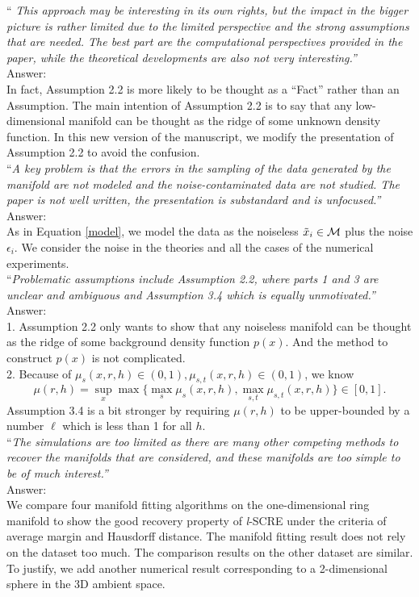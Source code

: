 \documentclass[12pt]{article}
\begin{document}
\noindent ``\textit{ This approach may be interesting in its own rights, but the impact in the bigger picture is rather limited due to the limited perspective and the strong assumptions that are needed. The best part are the computational perspectives provided in the paper, while the theoretical developments are also not very interesting.'' }\\
Answer:\\
In fact, Assumption 2.2 is more likely to be thought as a ``Fact'' rather than an Assumption. The main intention of Assumption 2.2 is to say that any low-dimensional manifold can be thought as the ridge of some unknown density function. In this new version of the manuscript, we modify the presentation of Assumption 2.2 to avoid the confusion.
\\
\noindent ``\textit {A key problem is that the errors in the sampling of the data generated by the manifold are not modeled and the noise-contaminated data are not studied. The paper is not well written, the presentation is substandard  and is unfocused.'' }\\
Answer:\\
As in Equation \eqref{model}, we model the data as the noiseless $\tilde{x}_i\in \cal M$ plus the noise $\epsilon_i$. We consider the noise in the theories and all the cases of the numerical experiments.\\

\noindent ``\textit{Problematic assumptions include Assumption 2.2, where parts 1 and 3 are unclear and ambiguous and Assumption 3.4 which is equally unmotivated.''}\\
Answer:\\
1. Assumption 2.2 only wants to show that any noiseless manifold can be thought as the ridge of some background density function $p(x)$. And the method to construct $p(x)$ is not complicated.\\
2. Because of $\mu_s(x,r,h)\in(0,1),\mu_{s,t}(x,r,h)\in (0,1)$, we know 
\[
\mu(r,h) = \sup_x \max\{\max_s \mu_s(x,r,h), \max_{s,t}\mu_{s,t}(x,r,h)\}\in [0,1].
\]
Assumption 3.4 is a bit stronger by requiring $\mu(r,h)$ to be upper-bounded by a number $\ell$ which is less than 1 for all $h$.\\
 \noindent ``\textit{The simulations are too limited as there are many other competing methods to recover the manifolds that are considered, and these manifolds are too simple to be of much interest.'' } \\
 Answer:\\
 We compare four manifold fitting algorithms on the one-dimensional ring manifold to show the good recovery property of {\it l}-SCRE under the criteria of average margin and Hausdorff distance. The manifold fitting result does not rely on the dataset too much. The comparison results on the other dataset are similar. To justify, we add another numerical result corresponding to a 2-dimensional sphere in the 3D ambient space.
\end{document}
